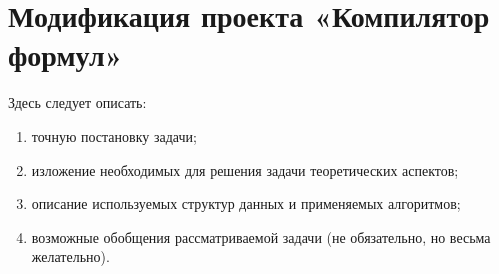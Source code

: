 \section{Модификация проекта «Компилятор формул»}

Здесь следует описать:

\begin{enumerate}[1)]
\item точную постановку задачи; 
\item изложение необходимых для решения задачи теоретических аспектов;
\item описание используемых структур данных и применяемых алгоритмов;
\item возможные обобщения рассматриваемой задачи (не обязательно, но 
      весьма желательно).
\end{enumerate}
